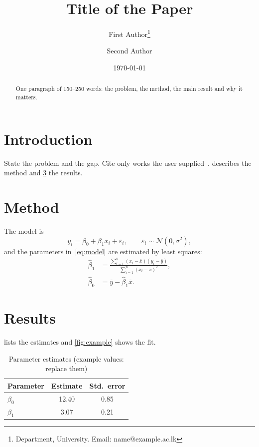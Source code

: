 \documentclass[11pt,a4paper]{article}
\title{Title of the Paper}%
\author{First Author\thanks{Department, University. Email: name@example.ac.lk}
  \and Second Author}%
\date{\today}
\begin{document}
\maketitle

\begin{abstract}
  One paragraph of 150--250 words: the problem, the method, the main result and why it matters.
\end{abstract}

\section{Introduction}
\label{sec:introduction}

State the problem and the gap.
Cite only works the user supplied~\cite{surname2023keyword}.
 describes the method and \cref{sec:results} the results.

\section{Method}
\label{sec:method}

The model is
\begin{equation}
  y_i = \beta_0 + \beta_1 x_i + \varepsilon_i,
  \qquad \varepsilon_i \sim \mathcal{N}(0, \sigma^2),
  \label{eq:model}
\end{equation}
and the parameters in~\eqref{eq:model} are estimated by least squares:
\begin{align}
  \hat{\beta}_1 &= \frac{\sum_{i=1}^{n} (x_i - \bar{x})(y_i - \bar{y})}
                        {\sum_{i=1}^{n} (x_i - \bar{x})^2}, \label{eq:slope} \\
  \hat{\beta}_0 &= \bar{y} - \hat{\beta}_1 \bar{x}. \label{eq:intercept}
\end{align}

\section{Results}
\label{sec:results}

 lists the estimates and \cref{fig:example} shows the fit.

\begin{table}[htbp]
  \centering
  \caption{Parameter estimates (example values: replace them)}
  \label{tab:results}
  \begin{tabular}{@{}lS[table-format=2.2]S[table-format=1.2]@{}}
    \toprule
    Parameter & {Estimate} & {Std.\ error} \\
    \midrule
    $\beta_0$ & 12.40 & 0.85 \\
    $\beta_1$ & 3.07  & 0.21 \\
    \bottomrule
  \end{tabular}
\end{table}
\end{document}
